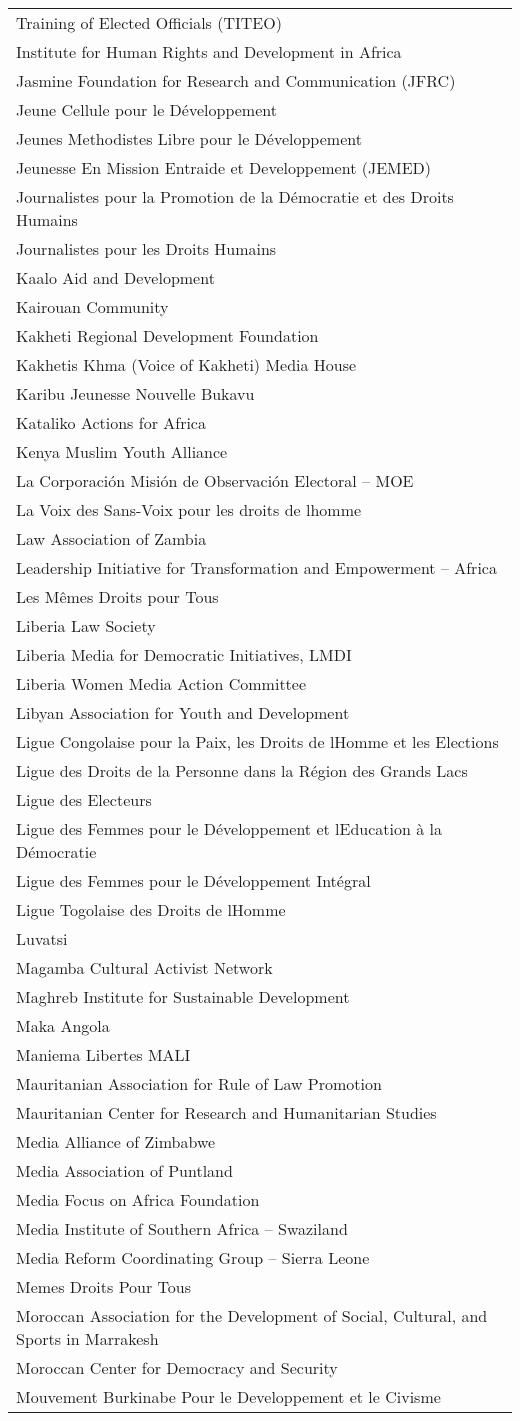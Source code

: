 \begin{longtable}[]{@{}l@{}}
Training of Elected Officials (TITEO)\tabularnewline
Institute for Human Rights and Development in Africa\tabularnewline
Jasmine Foundation for Research and Communication (JFRC)\tabularnewline
Jeune Cellule pour le Développement\tabularnewline
Jeunes Methodistes Libre pour le Développement\tabularnewline
Jeunesse En Mission Entraide et Developpement (JEMED)\tabularnewline
Journalistes pour la Promotion de la Démocratie et des Droits
Humains\tabularnewline
Journalistes pour les Droits Humains\tabularnewline
Kaalo Aid and Development\tabularnewline
Kairouan Community\tabularnewline
Kakheti Regional Development Foundation\tabularnewline
Kakhetis Khma (Voice of Kakheti) Media House\tabularnewline
Karibu Jeunesse Nouvelle Bukavu\tabularnewline
Kataliko Actions for Africa\tabularnewline
Kenya Muslim Youth Alliance\tabularnewline
La Corporación Misión de Observación Electoral -- MOE\tabularnewline
La Voix des Sans-Voix pour les droits de lhomme\tabularnewline
Law Association of Zambia\tabularnewline
Leadership Initiative for Transformation and Empowerment --
Africa\tabularnewline
Les Mêmes Droits pour Tous\tabularnewline
Liberia Law Society\tabularnewline
Liberia Media for Democratic Initiatives, LMDI\tabularnewline
Liberia Women Media Action Committee\tabularnewline
Libyan Association for Youth and Development\tabularnewline
Ligue Congolaise pour la Paix, les Droits de lHomme et les
Elections\tabularnewline
Ligue des Droits de la Personne dans la Région des Grands
Lacs\tabularnewline
Ligue des Electeurs\tabularnewline
Ligue des Femmes pour le Développement et lEducation à la
Démocratie\tabularnewline
Ligue des Femmes pour le Développement Intégral\tabularnewline
Ligue Togolaise des Droits de lHomme\tabularnewline
Luvatsi\tabularnewline
Magamba Cultural Activist Network\tabularnewline
Maghreb Institute for Sustainable Development\tabularnewline
Maka Angola\tabularnewline
Maniema Libertes MALI\tabularnewline
Mauritanian Association for Rule of Law Promotion\tabularnewline
Mauritanian Center for Research and Humanitarian Studies\tabularnewline
Media Alliance of Zimbabwe\tabularnewline
Media Association of Puntland\tabularnewline
Media Focus on Africa Foundation\tabularnewline
Media Institute of Southern Africa -- Swaziland\tabularnewline
Media Reform Coordinating Group -- Sierra Leone\tabularnewline
Memes Droits Pour Tous\tabularnewline
Moroccan Association for the Development of Social, Cultural, and Sports
in Marrakesh\tabularnewline
Moroccan Center for Democracy and Security\tabularnewline
Mouvement Burkinabe Pour le Developpement et le Civisme\tabularnewline

\end{longtable}
